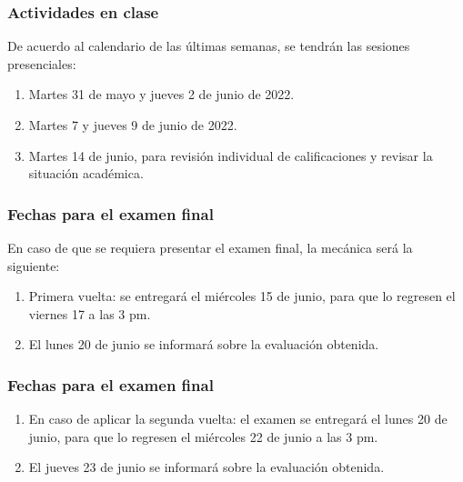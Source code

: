 \documentclass[12pt]{beamer}
\begin{document}
\begin{frame}
\frametitle{Actividades en clase}
De acuerdo al calendario de las últimas semanas, se tendrán las sesiones presenciales:
\begin{enumerate}[<+->]
\item Martes 31 de mayo y jueves 2 de junio de 2022.
\item Martes 7 y jueves 9 de junio de 2022.
\item Martes 14 de junio, para revisión individual de calificaciones y revisar la situación académica.
\end{enumerate}
\end{frame}
\begin{frame}
\frametitle{Fechas para el examen final}
En caso de que se requiera presentar el examen final, la mecánica será la siguiente:
\pause
{}
\begin{enumerate}[<+->]
\item Primera vuelta: se entregará el miércoles 15 de junio, para que lo regresen el viernes 17 a las 3 pm.
\item El lunes 20 de junio se informará sobre la evaluación obtenida.
\seti
\end{enumerate}
\end{frame}
\begin{frame}
\frametitle{Fechas para el examen final}
\begin{enumerate}[<+->]
\conti  
\item En caso de aplicar la segunda vuelta: el examen se entregará el lunes 20 de junio, para que lo regresen el miércoles 22 de junio a las 3 pm.
\item El jueves 23 de junio se informará sobre la evaluación obtenida.
\end{enumerate}
\end{frame}
\end{document}
